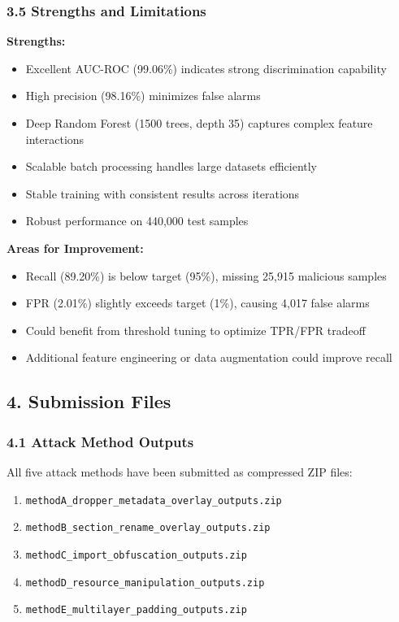 \documentclass[12pt,letterpaper]{article}
\begin{document}
\subsubsection*{3.5 Strengths and Limitations}

\textbf{Strengths:}
\begin{itemize}
    \item Excellent AUC-ROC (99.06\%) indicates strong discrimination capability
    \item High precision (98.16\%) minimizes false alarms
    \item Deep Random Forest (1500 trees, depth 35) captures complex feature interactions
    \item Scalable batch processing handles large datasets efficiently
    \item Stable training with consistent results across iterations
    \item Robust performance on 440,000 test samples
\end{itemize}

\textbf{Areas for Improvement:}
\begin{itemize}
    \item Recall (89.20\%) is below target (95\%), missing 25,915 malicious samples
    \item FPR (2.01\%) slightly exceeds target (1\%), causing 4,017 false alarms
    \item Could benefit from threshold tuning to optimize TPR/FPR tradeoff
    \item Additional feature engineering or data augmentation could improve recall
\end{itemize}

\subsection*{4. Submission Files}

\subsubsection*{4.1 Attack Method Outputs}

All five attack methods have been submitted as compressed ZIP files:
\begin{enumerate}
    \item \texttt{methodA\_dropper\_metadata\_overlay\_outputs.zip}
    \item \texttt{methodB\_section\_rename\_overlay\_outputs.zip}
    \item \texttt{methodC\_import\_obfuscation\_outputs.zip}
    \item \texttt{methodD\_resource\_manipulation\_outputs.zip}
    \item \texttt{methodE\_multilayer\_padding\_outputs.zip}
\end{enumerate}
\end{document}
